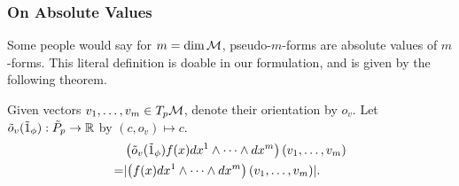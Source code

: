 \documentclass[../main.tex]{subfiles}
\begin{document}
    \subsubsection{On Absolute Values}
    \begin{remark}
        Some people would say for \(m=\dim \manifold[M]\), pseudo-\(m\)-forms are 
        absolute values of \(m\)-forms. This literal definition is doable in our 
        formulation, and is given by the following theorem.
    \end{remark}
    \newpage
    \begin{theorem}
        Given vectors \(v_1, \dots, v_m \in T_p\manifold[M]\), denote their 
        orientation by \(o_v\). Let \(\tilde{o}_v(\pseudo{1}_\phi) : \pseudoscalar[p] 
        \to \mathbb{R}\) by \((c, o_v) \mapsto c\).
        \[
        \begin{aligned}
            &\left(\tilde{o}_v(\pseudo{1}_\phi)f(x)dx^1\wedge\dots\wedge dx^m\right)
            (v_1, \dots, v_m) \\
            =&\lvert\left( f(x)dx^1\wedge\dots\wedge dx^m \right)
            (v_1, \dots, v_m)\rvert .
        \end{aligned}
        \]
    \end{theorem}
\end{document}
